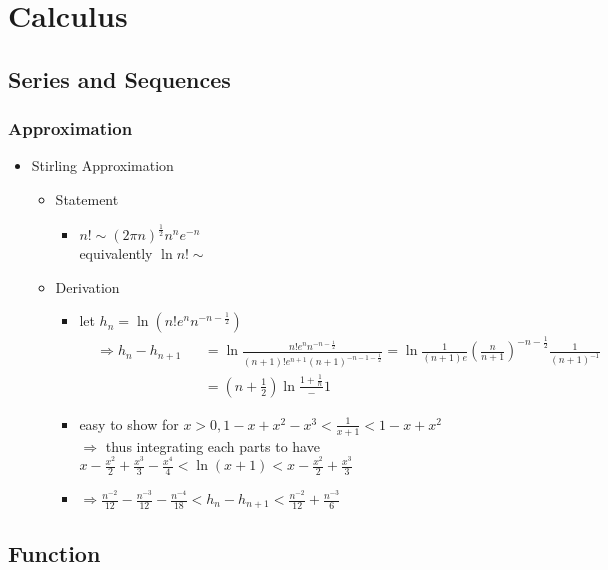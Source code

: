 \section{Calculus}
\subsection{Series and Sequences}
\subsubsection{Approximation}
\begin{itemize}
\item Stirling Approximation
	\begin{itemize}
	\item Statement
		\begin{itemize}
		\item $n! \sim (2\pi n)^\frac12 n^n e^{-n}$ \\
		equivalently $\ln n! \sim $
		\end{itemize}
	\item Derivation
		\begin{itemize}
		\item let $h_n=\ln(n! e^n n^{-n-\frac12})$ \\
		$\begin{alignedat}{3} &\Rightarrow h_n-h_{n+1} &&= \ln \frac{n! e^n n^{-n-\frac12}}{(n+1)! e^{n+1} (n+1)^{-n-1-\frac12}} = \ln \frac{1}{(n+1)e}(\frac{n}{n+1})^{-n-\frac12}\frac{1}{(n+1)^{-1}} \\
		& &&= (n+\frac12)\ln \frac{1+\frac1n} - 1
		\end{alignedat}$
		\item easy to show for $x>0, 1-x+x^2-x^3 < \frac 1 {x+1} < 1-x+x^2$ \\
		$\Rightarrow$ thus integrating each parts to have $x-\frac{x^2}{2}+\frac{x^3}{3}-\frac{x^4}{4} < \ln(x+1) < x-\frac{x^2}{2}+\frac{x^3}{3}$
		\item $\Rightarrow \frac{n^{-2}}{12} - \frac{n^{-3}}{12} - \frac{n^{-4}}{18}< h_n-h_{n+1} < \frac{n^{-2}}{12} + \frac{n^{-3}}{6}$
		\end{itemize}
	\end{itemize}
\end{itemize}

\subsection{Function}
